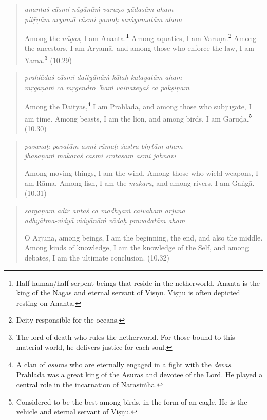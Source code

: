 \documentclass[12pt, twoside, openright]{memoir}
\begin{document}
\par
\begin{verse}
\textit{anantaś cāsmi nāgānāṁ varuṇo yādasām aham} \\
\textit{pitṝṇām aryamā cāsmi yamaḥ saṁyamatām aham}

\noindent Among the \textit{nāgas}, I am Ananta.\footnote{Half human/half serpent beings that reside in the netherworld. Ananta is the king of the Nāgas and eternal servant of Viṣṇu. Viṣṇu is often depicted resting on Ananta.} Among aquatics, I am Varuṇa.\footnote{Deity responsible for the oceans.} Among the ancestors, I am Aryamā, and among those who enforce the law, I am Yama.\footnote{The lord of death who rules the netherworld. For those bound to this material world, he delivers justice for each soul.} (10.29)
\end{verse}
\par



\par
\begin{verse}
\textit{prahlādaś cāsmi daityānāṁ kālaḥ kalayatām aham} \\
\textit{mṛgāṇāṁ ca mṛgendro 'haṁ vainateyaś ca pakṣiṇām}

\noindent Among the Daityas,\footnote{A clan of \textit{asuras} who are eternally engaged in a fight with the \textit{devas}. Prahlāda was a great king of the Asuras and devotee of the Lord. He played a central role in the incarnation of Nārasiṁha.} I am Prahlāda, and among those who subjugate, I am time. Among beasts, I am the lion, and among birds, I am Garuḍa.\footnote{Considered to be the best among birds, in the form of an eagle. He is the vehicle and eternal servant of Viṣṇu.} (10.30)
\end{verse}
\par



\par
\begin{verse}
\textit{pavanaḥ pavatām asmi rāmaḥ śastra-bhṛtām aham} \\
\textit{jhaṣāṇāṁ makaraś cāsmi srotasām asmi jāhnavī}

\noindent Among moving things, I am the wind. Among those who wield weapons, I am Rāma. Among fish, I am the \textit{makara}, and among rivers, I am Gaṅgā. (10.31)
\end{verse}
\par



\par
\begin{verse}
\textit{sargāṇām ādir antaś ca madhyaṁ caivāham arjuna} \\
\textit{adhyātma-vidyā vidyānāṁ vādaḥ pravadatām aham}

\noindent O Arjuna, among beings, I am the beginning, the end, and also the middle. Among kinds of knowledge, I am the knowledge of the Self, and among debates, I am the ultimate conclusion. (10.32)
\end{verse}
\par
\end{document}
